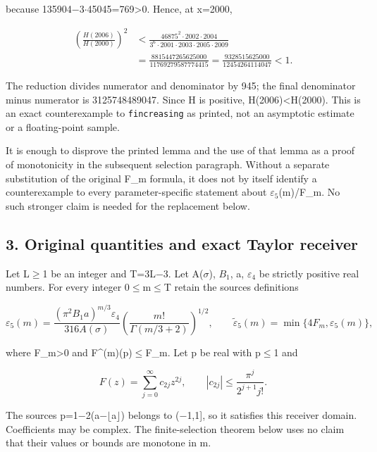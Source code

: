 \documentclass{article}
\begin{document}
because 135904\ensuremath{-}3\ensuremath{\cdot}45045=769\textgreater0. Hence, at x=2000,

\[
\begin{aligned}
\left(\frac{H(2006)}{H(2000)}\right)^2
&<\frac{46875^2\cdot2002\cdot2004}
{3^6\cdot2001\cdot2003\cdot2005\cdot2009}\\
&=\frac{8815447265625000}{11769279587774415}
=\frac{9328515625000}{12454264114047}<1.
\end{aligned}
\]

The reduction divides numerator and denominator by 945; the final denominator minus numerator is 3125748489047. Since H is positive, H(2006)\textless H(2000). This is an exact counterexample to \texttt{fincreasing} as printed, not an asymptotic estimate or a floating-point sample.

It is enough to disprove the printed lemma and the use of that lemma as a proof of monotonicity in the subsequent selection paragraph. Without a separate substitution of the original F\_m formula, it does not by itself identify a counterexample to every parameter-specific statement about \ensuremath{\varepsilon_{5}}(m)/F\_m. No such stronger claim is needed for the replacement below.

\subsection{3. Original quantities and exact Taylor receiver}\label{original-quantities-and-exact-taylor-receiver}

Let L\ensuremath{\ge}1 be an integer and T=3L\ensuremath{-}3. Let A(\ensuremath{\sigma}), \ensuremath{B_{1}}, a, \ensuremath{\varepsilon_{4}} be strictly positive real numbers. For every integer 0\ensuremath{\le}m\ensuremath{\le}T retain the source\textquotesingle s definitions

\[
\varepsilon_5(m)
=\frac{(\pi^2 B_1a)^{m/3}\varepsilon_4}{316A(\sigma)}
\left(\frac{m!}{\Gamma(m/3+2)}\right)^{1/2},
\qquad
\widetilde\varepsilon_5(m)=\min\{4F_m,\varepsilon_5(m)\},
\]

where F\_m\textgreater0 and \textbar F\^{}(m)(p)\textbar\ensuremath{\le}F\_m. Let p be real with \textbar p\textbar\ensuremath{\le}1 and

\[
F(z)=\sum_{j=0}^{\infty}c_{2j}z^{2j},\qquad
|c_{2j}|\le\frac{\pi^j}{2^{j+1}j!}.
\]

The source\textquotesingle s p=1\ensuremath{-}2(a\ensuremath{-}\ensuremath{\lfloor}a\ensuremath{\rfloor}) belongs to (\ensuremath{-}1,1{]}, so it satisfies this receiver domain. Coefficients may be complex. The finite-selection theorem below uses no claim that their values or bounds are monotone in m.
\end{document}
